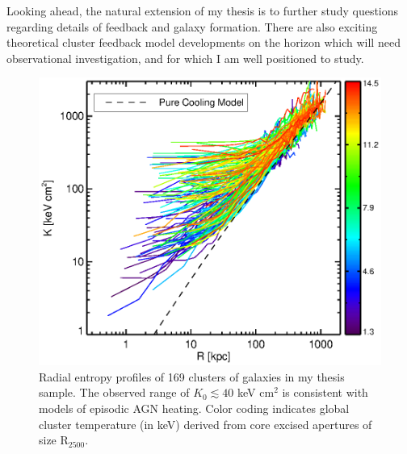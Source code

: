 \documentclass[11pt]{article}
\begin{document}
Looking ahead, the natural extension of my thesis is to further study
questions regarding details of feedback and galaxy formation. There
are also exciting theoretical cluster feedback model developments on
the horizon which will need observational investigation, and for which
I am well positioned to study.

\clearpage
\begin{figure}[t]
\centering
    \begin{minipage}[t]{0.6\linewidth}
	\includegraphics*[width=\textwidth, trim=28mm 8mm 30mm 10mm, clip]{splots}
        \caption{\small Radial entropy profiles of 169 clusters of
	galaxies in my thesis sample. The observed range of $K_0 \lesssim
	40$ keV cm$^2$ is consistent with models of episodic AGN
	heating. Color coding indicates global cluster temperature (in keV)
	derived from core excised apertures of size R$_{2500}$.}
	\label{fig:splots}
    \end{minipage}
    \hspace{0.1in}
    \begin{minipage}[t]{0.6\linewidth}

\end{minipage}
\end{figure}
\end{document}
